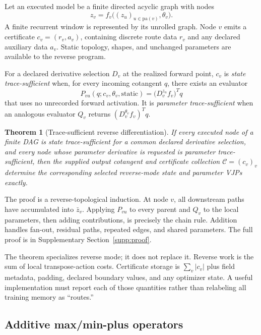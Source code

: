 \documentclass[10pt]{article}
\newtheorem{theorem}{Theorem}
\newcommand{\cert}{\mathcal{C}}
\begin{document}
Let an executed model be a finite directed acyclic graph with nodes
\begin{equation}
 z_v=f_v\big((z_u)_{u\in\mathrm{pa}(v)},\theta_v\big).
\end{equation}
A finite recurrent window is represented by its unrolled graph.  Node $v$
emits a certificate $c_v=(r_v,a_v)$, containing discrete route data $r_v$ and
any declared auxiliary data $a_v$.  Static topology, shapes, and unchanged
parameters are available to the reverse program.

For a declared derivative selection $D_v$ at the realized forward point,
$c_v$ is \emph{state trace-sufficient} when, for every incoming cotangent $q$,
there exists an evaluator
\begin{equation}
 P_{vu}(q;c_v,\theta_v,\mathrm{static})
 =\big(D_v^{z_u}f_v\big)^Tq
\end{equation}
that uses no unrecorded forward activation.  It is \emph{parameter
trace-sufficient} when an analogous evaluator $Q_v$ returns
$(D_v^{\theta_v}f_v)^Tq$.

\begin{theorem}[Trace-sufficient reverse differentiation]
If every executed node of a finite DAG is state trace-sufficient for a common
declared derivative selection, and every node whose parameter derivative is
requested is parameter trace-sufficient, then the supplied output cotangent
and certificate collection $\cert=(c_v)_v$ determine the corresponding
selected reverse-mode state and parameter VJPs exactly.
\end{theorem}

The proof is a reverse-topological induction.  At node $v$, all downstream
paths have accumulated into $\bar z_v$.  Applying $P_{vu}$ to every parent and
$Q_v$ to the local parameters, then adding contributions, is precisely the
chain rule.  Addition handles fan-out, residual paths, repeated edges, and
shared parameters.  The full proof is in Supplementary Section~\ref{supp:proof}.

The theorem specializes reverse mode; it does not replace it.  Reverse work is
the sum of local transpose-action costs.  Certificate storage is
$\sum_v |c_v|$ plus field metadata, padding, declared boundary values, and any
optimizer state.  A useful implementation must report each of those quantities
rather than relabeling all training memory as ``routes.''

\subsection{Additive max/min-plus operators}
\end{document}
